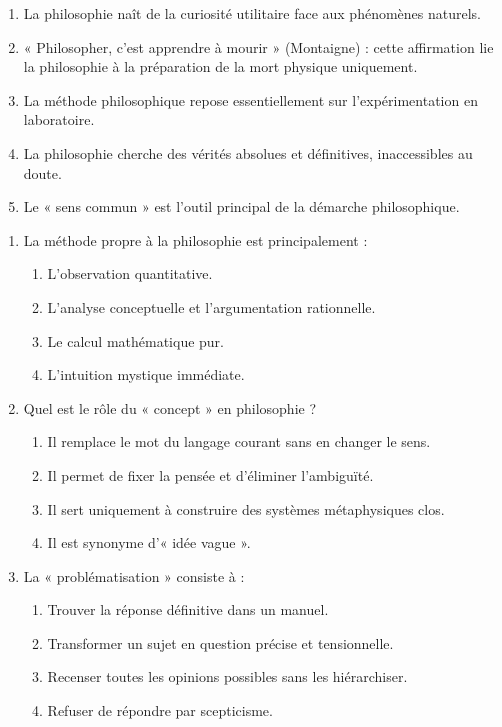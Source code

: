 \documentclass[11pt]{article}
\begin{document}
\begin{exercice}
\begin{enumerate}
    \item La philosophie naît de la curiosité utilitaire face aux phénomènes naturels.
    \item « Philosopher, c'est apprendre à mourir » (Montaigne) : cette affirmation lie la philosophie à la préparation de la mort physique uniquement.
    \item La méthode philosophique repose essentiellement sur l'expérimentation en laboratoire.
    \item La philosophie cherche des vérités absolues et définitives, inaccessibles au doute.
    \item Le « sens commun » est l'outil principal de la démarche philosophique.
\end{enumerate}
\end{exercice}

\begin{exercice}
\begin{enumerate}
    \item La méthode propre à la philosophie est principalement :
    \begin{enumerate}
        \item L'observation quantitative.
        \item L'analyse conceptuelle et l'argumentation rationnelle.
        \item Le calcul mathématique pur.
        \item L'intuition mystique immédiate.
    \end{enumerate}
    \item Quel est le rôle du « concept » en philosophie ?
    \begin{enumerate}
        \item Il remplace le mot du langage courant sans en changer le sens.
        \item Il permet de fixer la pensée et d'éliminer l'ambiguïté.
        \item Il sert uniquement à construire des systèmes métaphysiques clos.
        \item Il est synonyme d'« idée vague ».
    \end{enumerate}
    \item La « problématisation » consiste à :
    \begin{enumerate}
        \item Trouver la réponse définitive dans un manuel.
        \item Transformer un sujet en question précise et tensionnelle.
        \item Recenser toutes les opinions possibles sans les hiérarchiser.
        \item Refuser de répondre par scepticisme.
    \end{enumerate}
\end{enumerate}
\end{exercice}
\end{document}
